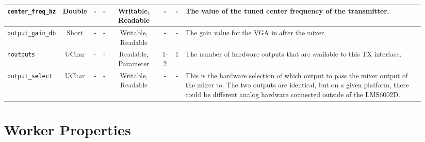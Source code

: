 \begin{landscape}
\begin{scriptsize}
\begin{tabular}{|p{3cm}|c|c|c|c|c|c|p{10cm}|}
			\hline
			\verb+center_freq_hz+        & Double & -        & -          & Writable, Readable  & -     & -       & The value of the tuned center frequency of the transmitter.                                                                                                                                                                 \\
			\hline
			\verb+output_gain_db+        & Short  & -        & -          & Writable, Readable  & -     & -       & The gain value for the VGA in after the mixer.                                                                                                                                                                              \\
			\hline
			\verb+noutputs+              & UChar  & -        & -          & Readable, Parameter & 1-2   & 1       & The number of hardware outputs that are available to this TX interface.                                                                                                                                                     \\
			\hline
			\verb+output_select+         & UChar  & -        & -          & Writable, Readable  & -     & -       & This is the hardware selection of which output to pass the mixer output of the mixer to. The two outputs are identical, but on a given platform, there could be different analog hardware connected outside of the LMS6002D. \\
			\hline
		\end{tabular}
	\end{scriptsize}

	\section*{Worker Properties}

\end{landscape}
